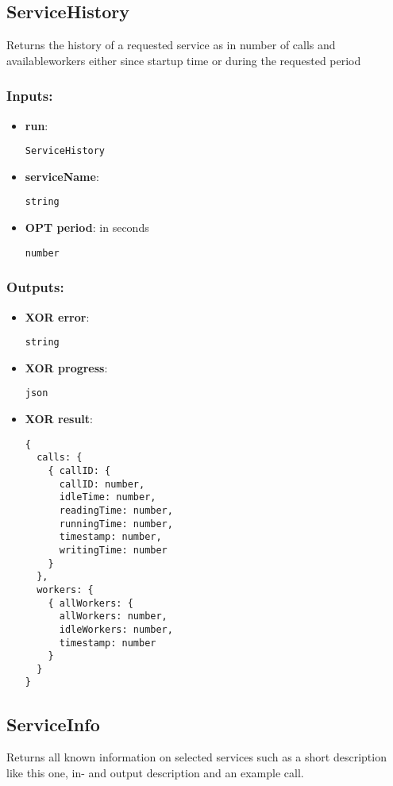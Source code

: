 \subsection{ServiceHistory}
\label{ch:builtinservices:ServiceHistory}
Returns
 the history of a requested service as in number of calls and 
availableworkers either since startup time or during the requested 
period
\subsubsection*{Inputs:}
\begin{itemize}
    \item \textbf{run}: 
\begin{lstlisting}
ServiceHistory
\end{lstlisting}
    \item \textbf{serviceName}: 
\begin{lstlisting}
string
\end{lstlisting}
    \item \textbf{OPT period}: in seconds
\begin{lstlisting}
number
\end{lstlisting}
  \end{itemize}

\subsubsection*{Outputs:}
\begin{itemize}
    \item \textbf{XOR error}: 
\begin{lstlisting}
string
\end{lstlisting}
    \item \textbf{XOR progress}: 
\begin{lstlisting}
json
\end{lstlisting}
    \item \textbf{XOR result}: 
\begin{lstlisting}
{
  calls: {
    { callID: {
      callID: number, 
      idleTime: number, 
      readingTime: number, 
      runningTime: number, 
      timestamp: number, 
      writingTime: number
    }
  }, 
  workers: {
    { allWorkers: {
      allWorkers: number, 
      idleWorkers: number, 
      timestamp: number
    }
  }
}
\end{lstlisting}
  \end{itemize}

\subsection{ServiceInfo}
\label{ch:builtinservices:ServiceInfo}
Returns
 all known information on selected services such as a short description 
like this one, in- and output description and an example call. 
